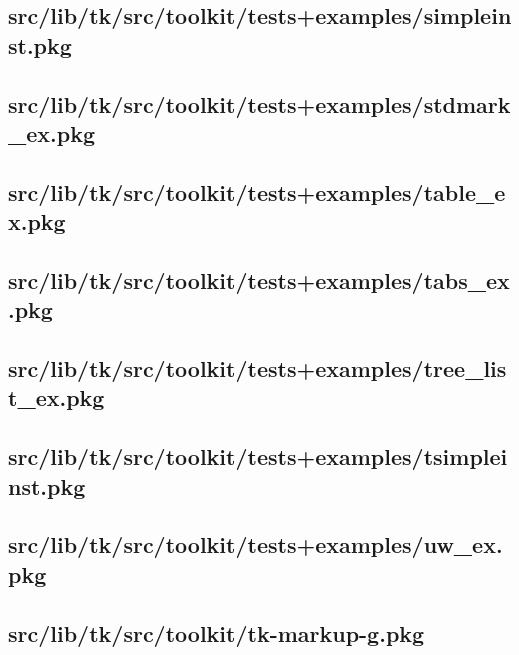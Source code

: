 \subsection{src/lib/tk/src/toolkit/tests+examples/simpleinst.pkg}


\subsection{src/lib/tk/src/toolkit/tests+examples/stdmark\_ex.pkg}


\subsection{src/lib/tk/src/toolkit/tests+examples/table\_ex.pkg}


\subsection{src/lib/tk/src/toolkit/tests+examples/tabs\_ex.pkg}


\subsection{src/lib/tk/src/toolkit/tests+examples/tree\_list\_ex.pkg}


\subsection{src/lib/tk/src/toolkit/tests+examples/tsimpleinst.pkg}


\subsection{src/lib/tk/src/toolkit/tests+examples/uw\_ex.pkg}


\subsection{src/lib/tk/src/toolkit/tk-markup-g.pkg}


